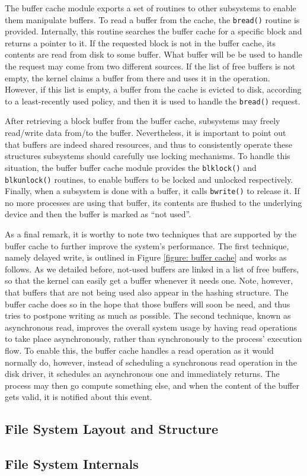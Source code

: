\documentclass[10pt,a4paper]{article}
\begin{document}
The buffer cache module exports a set of routines to other subsystems to enable them manipulate buffers. To read a buffer from the cache, the \texttt{bread()} routine is provided. Internally, this routine searches the buffer cache for a specific block and returns a pointer to it. If the requested block is not in the buffer cache, its contents are read from disk to some buffer. What buffer will be be used to handle the request may come from two different sources. If the list of free buffers is not empty, the kernel claims a buffer from there and uses it in the operation. However, if this list is empty, a buffer from the cache is evicted to disk, according to a least-recently used policy, and then it is used to handle the \texttt{bread()} request.

After retrieving a block buffer from the buffer cache, subsystems may freely read/write data from/to the buffer. Nevertheless, it is important to point out that buffers are indeed shared resources, and thus to consistently operate these structures subsystems should carefully use locking mechanisms. To handle this situation, the buffer  buffer cache module provides the \texttt{blklock()} and \texttt{blkunlock()} routines, to enable buffers to be locked and unlocked respectively. Finally, when a subsystem is done with a buffer, it calls \texttt{bwrite()} to release it. If no more processes are using that buffer, its contents are flushed to the underlying device and then the buffer is marked as ``not used''.

As a final remark, it is worthy to note two techniques that are supported by the buffer cache to further improve the system's performance. The first technique, namely delayed write, is outlined in Figure \ref{figure: buffer cache} and works as follows. As we detailed before, not-used buffers are linked in a list of free buffers, so that the kernel can easily get a buffer whenever it needs one. Note, however, that buffers that are not being used also appear in the hashing structure. The buffer cache does so in the hope that those buffers will soon be need, and thus tries to postpone writing as much as possible. The second technique, known as asynchronous read, improves the overall system usage by having read operations to take place asynchronously, rather than synchronously to the process' execution flow. To enable this, the buffer cache handles a read operation as it would normally do, however, instead of scheduling a synchronous read operation in the disk driver, it schedules an asynchronous one and immediately returns. The process may then go compute something else, and when the content of the buffer gets valid, it is notified about this event.

\subsection{File System Layout and Structure}
\label{subsection: file system layout and structure}

\subsection{File System Internals}
\label{subsection: file system internals}

\printbibliography
\end{document}
